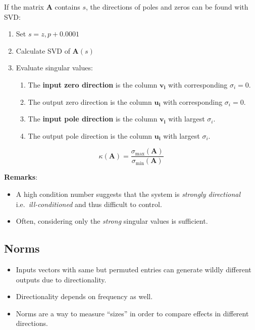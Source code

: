 If the matrix $\mathbf{A}$ contains $s$, the directions of poles and zeros can be found with SVD:
\begin{enumerate}
    \item Set $s=z, p+0.0001$
    \item Calculate SVD of $\mathbf{A}(s)$
    \item Evaluate singular values:
          \begin{enumerate}
              \item The \textbf{input zero direction} is the column $\mathbf{v_i}$ with corresponding $\sigma_i=0$.
              \item The output zero direction is the column $\mathbf{u_i}$ with corresponding $\sigma_i=0$.
              \item The \textbf{input pole direction} is the column $\mathbf{v_i}$ with largest $\sigma_i$.
              \item The output pole direction is the column $\mathbf{u_i}$ with largest $\sigma_i$.
          \end{enumerate}
\end{enumerate}

\newpar{}
\noindent\begin{equation*}
    \kappa(\mathbf{A})=\frac{\sigma_{\max}(\mathbf{A})}{\sigma_{\min}(\mathbf{A})}
\end{equation*}

\textbf{Remarks}:
\begin{itemize}
    \item A high condition number suggests that the system is \textit{strongly directional} i.e.\ \textit{ill-conditioned} and thus difficult to control.
    \item Often, considering only the \textit{strong} singular values is sufficient.
\end{itemize}

\subsection{Norms}
\begin{itemize}
    \item Inputs vectors with same but permuted entries can generate wildly different outputs due to directionality.
    \item Directionality depends on frequency as well.
    \item Norms are a way to measure ``sizes'' in order to compare effects in different directions.
\end{itemize}

